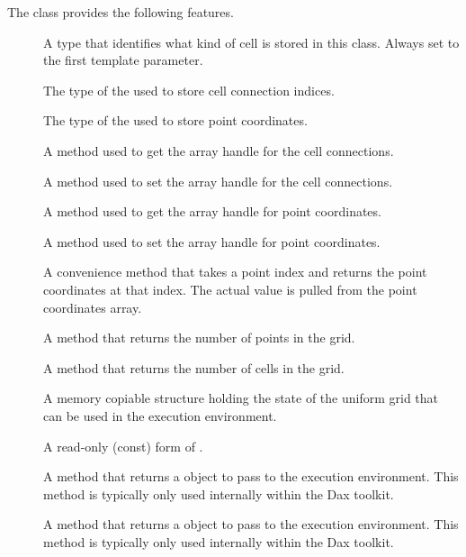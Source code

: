 The  class provides the following features.
\begin{description}
\item[] A type that identifies what kind of cell is
  stored in this class. Always set to the first template parameter.
\item[] The type of the 
  used to store cell connection indices.
\item[] The type of the
   used to store point coordinates.
\item[] A method used to get the array handle
  for the cell connections.
\item[] A method used to set the array handle
  for the cell connections.
\item[] A method used to get the array handle
  for point coordinates.
\item[] A method used to set the array handle
  for point coordinates.
\item[] A convenience method that takes a
  point index and returns the point coordinates at that index. The actual
  value is pulled from the point coordinates array.
\item[] A method that returns the number of
  points in the grid.
\item[] A method that returns the number of
  cells in the grid.
\item[] A memory copiable structure
  holding the state of the uniform grid that can be used in the execution
  environment.
\item[] A read-only (const) form of
  .
\item[] A method that returns a
   object to pass to the execution
  environment. This method is typically only used internally within the Dax
  toolkit.
\item[] A method that returns a
   object to pass to the execution
  environment. This method is typically only used internally within the Dax
  toolkit.
\end{description}


